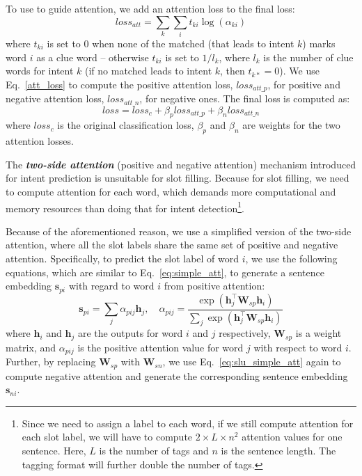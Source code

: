 To use \REs to guide attention, we add an attention loss to the final loss:
\begin{equation}
loss_{att} = \sum_{k}{\sum_{i}{t_{ki}\log(\alpha_{ki})}}
\label{att_loss}
\end{equation}
where $t_{ki}$ is set to $0$ when none of the matched \REs (that leads to intent $k$) marks word $i$ as a clue word -- otherwise $t_{ki}$
is set to $1/l_{k}$, where $l_k$ is the number of clue words
for intent $k$ (if no matched \RE leads to intent $k$, then $t_{k*}=0$).
We use Eq.~\ref{att_loss}
to compute the positive attention loss, $loss_{att\_p}$, for positive \REs and negative attention loss, $loss_{att\_n}$, for negative ones.
The final loss is computed as:
\begin{equation}
loss = loss_{c} + \beta_p loss_{att\_p} + \beta_n loss_{att\_n}
\end{equation}
where $loss_{c}$ is the original classification loss, $\beta_p$ and $\beta_n$ are weights for the two attention losses.

The \textbf{\emph{two-side attention}} (positive and negative attention) mechanism introduced for intent prediction is unsuitable for slot
filling. Because for slot filling, we need to compute attention for each word, which demands more computational and memory resources than
doing that for intent detection\footnote{Since we need to assign a label to each word, if we still compute attention for each slot label,
we will have to compute $2\times L \times n^2$ attention values for one sentence. Here, $L$ is the number of tags and $n$ is the sentence
length. The \BIO tagging format will further double the number of tags.}.

Because of the aforementioned reason, we use a simplified version of the two-side attention, where all the slot labels share the same set
of positive and negative attention. Specifically, to predict the slot label of word $i$, we use the following equations, which are similar
to Eq.~\ref{eq:simple_att}, to generate a sentence embedding $\textbf{s}_{pi}$ with regard to word $i$ from positive attention:
\begin{equation}
\textbf{s}_{pi} = \sum_{j}{\alpha_{pij}\textbf{h}_j}, \quad \alpha_{pij}=\frac{\exp(\textbf{h}_j^\intercal\textbf{W}_{sp}\textbf{h}_i)}{\sum_{j}{\exp(\textbf{h}_j^\intercal \textbf{W}_{sp}\textbf{h}_i)}}
\label{eq:slu_simple_att}
\end{equation}
where $\textbf{h}_i$ and $\textbf{h}_j$ are the \BLSTM outputs for word $i$ and $j$ respectively, $\textbf{W}_{sp}$ is a weight matrix, and
$\alpha_{pij}$ is the positive attention value for word $j$ with respect to word $i$. Further, by replacing $\textbf{W}_{sp}$ with
$\textbf{W}_{sn}$, we use  Eq.~\ref{eq:slu_simple_att} again to compute negative attention and generate the corresponding sentence
embedding $\textbf{s}_{ni}$.

